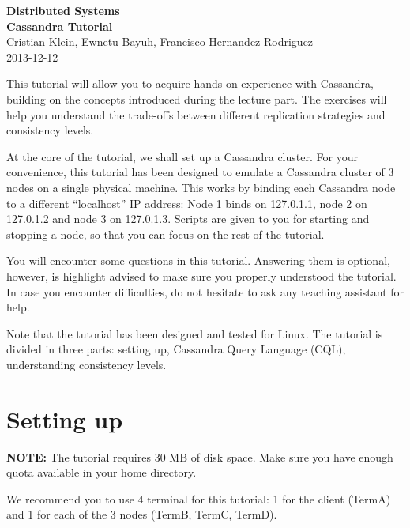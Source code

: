 \documentclass[a4paper,12pt]{article}
\newcounter{question}
\begin{document}
\begin{center}
	{\Large\bf Distributed Systems} \\[2mm]
	{\large\bf Cassandra Tutorial} \\[2mm]
	{Cristian Klein, Ewnetu Bayuh, Francisco Hernandez-Rodriguez} \\
	{2013-12-12}
\end{center}

This tutorial will allow you to acquire hands-on experience with Cassandra, building on the concepts introduced during the lecture part. The exercises will help you understand the trade-offs between different replication strategies and consistency levels.

At the core of the tutorial, we shall set up a Cassandra cluster. For your convenience, this tutorial has been designed to emulate a Cassandra cluster of 3 nodes on a single physical machine. This works by binding each Cassandra node to a different ``localhost'' IP address: Node 1 binds on 127.0.1.1, node 2 on 127.0.1.2 and node 3 on 127.0.1.3. Scripts are given to you for starting and stopping a node, so that you can focus on the rest of the tutorial.

You will encounter some questions in this tutorial. Answering them is optional, however, is highlight advised to make sure you properly understood the tutorial. In case you encounter difficulties, do not hesitate to ask any teaching assistant for help.

Note that the tutorial has been designed and tested for Linux. The tutorial is divided in three parts: setting up, Cassandra Query Language (CQL), understanding consistency levels.

\section{Setting up}

\textbf{NOTE:} The tutorial requires 30 MB of disk space. Make sure you have enough quota available in your home directory.

We recommend you to use 4 terminal for this tutorial: 1 for the client (TermA) and 1 for each of the 3 nodes (TermB, TermC, TermD).
\end{document}
